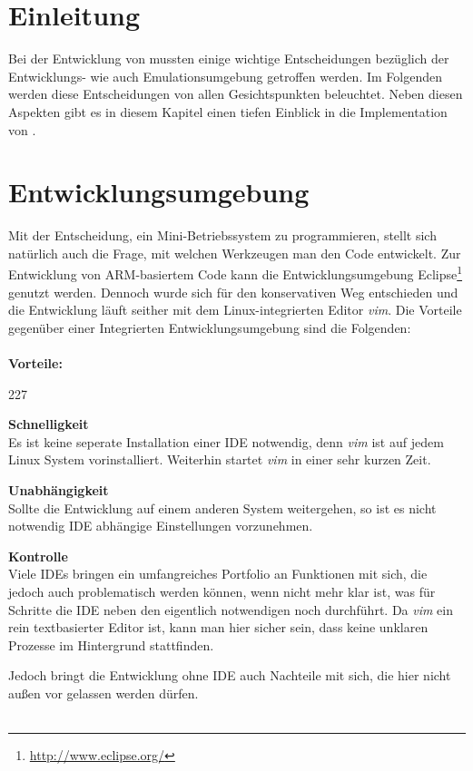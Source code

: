 \section{Einleitung}
Bei der Entwicklung von \mops mussten einige wichtige Entscheidungen bez\"uglich der Entwicklungs- wie auch Emulationsumgebung getroffen werden. Im Folgenden werden diese Entscheidungen von allen Gesichtspunkten beleuchtet. Neben diesen Aspekten gibt es in diesem Kapitel einen tiefen Einblick in die Implementation von \mops. 

\section{Entwicklungsumgebung}
Mit der Entscheidung, ein Mini-Betriebssystem zu programmieren, stellt sich nat\"urlich auch die Frage, mit welchen Werkzeugen man den Code entwickelt. Zur Entwicklung von ARM-basiertem Code kann die Entwicklungsumgebung Eclipse\footnote{\url{http://www.eclipse.org/}}  genutzt werden. Dennoch wurde sich f\"ur den konservativen Weg entschieden und die Entwicklung l\"auft seither mit dem Linux-integrierten Editor \textit{vim}. Die Vorteile gegen\"uber einer Integrierten Entwicklungsumgebung sind die Folgenden: \\\\
\textbf{Vorteile:}
\begin{dinglist}{227}
	\item{\textbf{Schnelligkeit}}\\
	 Es ist keine seperate Installation einer IDE notwendig, denn \textit{vim} ist auf jedem Linux System vorinstalliert. Weiterhin startet \textit{vim} in einer sehr kurzen Zeit.
	\item{\textbf{Unabh\"angigkeit}}\\
	Sollte die Entwicklung auf einem anderen System weitergehen, so ist es nicht notwendig IDE abh\"angige Einstellungen vorzunehmen.
	\item{\textbf{Kontrolle}}\\
	Viele IDEs bringen ein umfangreiches Portfolio an Funktionen mit sich, die jedoch auch problematisch werden k\"onnen, wenn nicht mehr klar ist, was f\"ur Schritte die IDE neben den eigentlich notwendigen noch durchf\"uhrt. Da \textit{vim} ein rein textbasierter Editor ist, kann man hier sicher sein, dass keine unklaren Prozesse im Hintergrund stattfinden.
\end{dinglist}
Jedoch bringt die Entwicklung ohne IDE auch Nachteile mit sich, die hier nicht au\ss en vor gelassen werden d\"urfen.\\ \\
